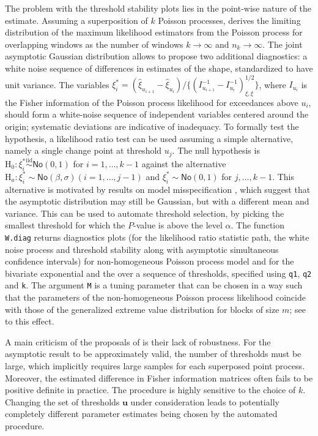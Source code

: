 \documentclass[]{book}
\begin{document}
The problem with the threshold stability plots lies in the point-wise nature of the estimate. Assuming a superposition of \(k\) Poisson processes, \citet{Wadsworth:2016} derives the limiting distribution of the maximum likelihood estimators from the Poisson process for overlapping windows as the number of windows \(k \to \infty\) and \(n_k \to \infty\). The joint asymptotic Gaussian distribution allows \citet{Wadsworth:2016} to propose two additional diagnostics: a white noise sequence of differences in estimates of the shape, standardized to have unit variance. The variables \(\xi^*_i=(\hat{\xi}_{u_{i+1}}-\hat{\xi}_{u_i})/\{(I^{-1}_{u_{i+1}}-I^{-1}_{u_{i}})_{\xi,\xi}^{1/2}\}\), where \(I_{u_{i}}\) is the Fisher information of the Poisson process likelihood for exceedances above \(u_i\), should form a white-noise sequence of independent variables centered around the origin; systematic deviations are indicative of inadequacy. To formally test the hypothesis, a likelihood ratio test can be used assuming a simple alternative, namely a single change point at threshold \(u_j\). The null hypothesis is \(\mathrm{H}_0: \xi_i^* \stackrel{\mathrm{iid}}{\sim}\textsf{No}(0,1)\) for \(i=1, \ldots, k-1\) against the alternative \(\mathrm{H}_a: \xi^*_i \sim \textsf{No}(\beta, \sigma) (i=1, \ldots, j-1)\) and \(\xi^*_i \sim \textsf{No}(0,1)\) for \(j, \ldots, k-1\). This alternative is motivated by results on model misspecification \citep{White:1982}, which suggest that the asymptotic distribution may still be Gaussian, but with a different mean and variance. This can be used to automate threshold selection, by picking the smallest threshold for which the \(P\)-value is above the level \(\alpha\). The function \texttt{W.diag} returns diagnostics plots (for the likelihood ratio statistic path, the white noise process and threshold stability along with asymptotic simultaneous confidence intervals) for non-homogeneous Poisson process model and for the bivariate exponential and the over a sequence of thresholds, specified using \texttt{q1}, \texttt{q2} and \texttt{k}. The argument \texttt{M} is a tuning parameter that can be chosen in a way such that the parameters of the non-homogeneous Poisson process likelihood coincide with those of the generalized extreme value distribution for blocks of size \(m\); see \citet{Coles:2001} to this effect.

A main criticism of the proposals of \citet{Wadsworth:2016} is their lack of robustness. For the asymptotic result to be approximately valid, the number of thresholds must be large, which implicitly requires large samples for each superposed point process. Moreover, the estimated difference in Fisher information matrices often fails to be positive definite in practice. The procedure is highly sensitive to the choice of \(k\). Changing the set of thresholds \(\boldsymbol{u}\) under consideration leads to potentially completely different parameter estimates being chosen by the automated procedure.
\end{document}
